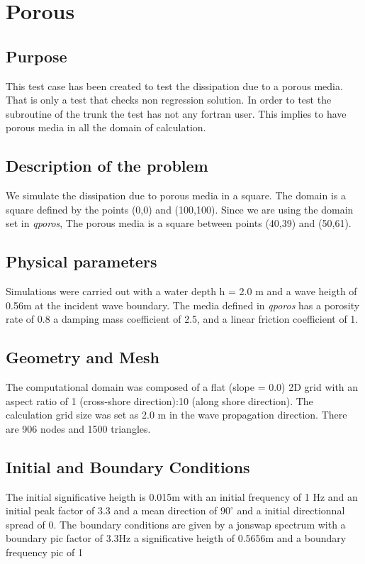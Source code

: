 \chapter{Porous}
%
%
\section{Purpose}
%
This test case has been created to test the dissipation due to a porous media. That is only a test that checks non regression solution. In order to test the subroutine of the trunk the test has not any fortran user. This implies to have porous media in all the domain of calculation.  


%
\section{Description of the problem}
%
We simulate the dissipation due to porous media in a square. The domain is a square defined by the points (0,0) and (100,100). Since we are using the domain set in {\it qporos}, The porous media is a square between points (40,39) and (50,61).  


\section{Physical parameters}
Simulations were carried out with a water depth h = 2.0 m and a wave heigth of 0.56m at the incident wave boundary. The media defined in {\it qporos} has a porosity rate of 0.8 a damping mass coefficient  of 2.5, and a linear friction coefficient of 1.

\section{Geometry and Mesh}
The computational domain was composed of a flat (slope = 0.0) 2D grid with an aspect ratio of 1 (cross-shore direction):10 (along shore direction).
The calculation grid size was set as 2.0 m in the wave propagation direction. There are 906 nodes
and 1500 triangles.

%
%
\section{Initial and Boundary Conditions}
%
    The initial  significative heigth is 0.015m with an initial frequency of 1 Hz and an initial peak factor of 3.3 and a mean direction of $90^{\circ}$ and a initial directionnal spread of 0.
The boundary conditions are given by a jonswap spectrum with a boundary pic factor of 3.3Hz a significative heigth of 0.5656m and a boundary frequency pic of 1

